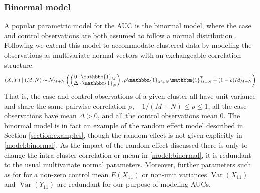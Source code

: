 \documentclass[12pt]{article}
\DeclareMathOperator{\V}{Var}
\DeclareMathOperator{\corr}{Corr}
\newcommand{\E}{E}
\newcommand{\comment}[1]{
  \iftoggle{commenttoggle}{
    {\normalsize{\color{red}{ #1}}\normalsize}
  }
  {}
}
\begin{document}
\subsubsection{Binormal model}
A popular parametric model for the AUC is the binormal model, where
the case and control observations are both assumed to follow a normal
distribution \citep{hanley1988}. Following \cite{obuchowski1997} we
extend this model to accommodate clustered data by modeling the
observations as multivariate normal vectors with an exchangeable
correlation structure.
\begin{align}
  (X,Y) \mid (M,N) \sim \mathcal{N}_{M+N}\left(
    \begin{pmatrix}0\cdot\mathbbm{1}_M\\ \Delta\cdot\mathbbm{1}_N\end{pmatrix},
  \rho\mathbbm{1}_{M+N}\mathbbm{1}_{M+N}^T + (1-\rho)Id_{M+N}
  \right)\label{model:binormal}
\end{align}
That is, the case and control observations of a given cluster all have
unit variance and share the same pairwise correlation $\rho$,
$-1/(M+N)\le\rho\le 1$, all the case observations have mean $\Delta>0$,
and all the control observations mean $0$. The binormal model is in fact an
example of the random effect model described in Section
\ref{section:examples}, though the random effect is not given explicitly in \eqref{model:binormal}. As the impact of the random effect discussed there is only to
change the intra-cluster correlation or mean in \eqref{model:binormal}, it is redundant
to the usual multivariate normal parameters. %
Moreover, further parameters such as for %
for a non-zero control mean $\E(X_{11})$ or non-unit
variances $\V(X_{11})$ and $\V(Y_{11})$ are
redundant for our purpose of modeling AUCs.%
\end{document}
